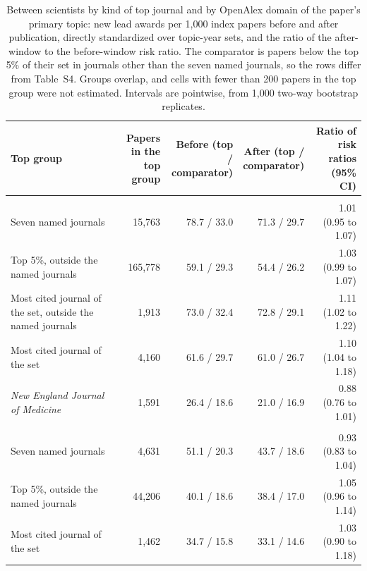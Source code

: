 \begin{table}[H]
\centering\small
\caption{Between scientists by kind of top journal and by OpenAlex domain of the paper's primary topic: new lead awards per 1,000 index papers before and after publication, directly standardized over topic-year sets, and the ratio of the after-window to the before-window risk ratio. The comparator is papers below the top 5\% of their set in journals other than the seven named journals, so the rows differ from Table~S4. Groups overlap, and cells with fewer than 200 papers in the top group were not estimated. Intervals are pointwise, from 1,000 two-way bootstrap replicates.}\label{tab:s_split}
\footnotesize
\begin{tabularx}{\linewidth}{>{\raggedright\arraybackslash}Xrrrr}
\toprule
Top group & \makecell[rb]{Papers in the\\top group} & \makecell[rb]{Before (top /\\comparator)} & \makecell[rb]{After (top /\\comparator)} & \makecell[rb]{Ratio of risk\\ratios (95\%\\CI)} \\
\midrule
\multicolumn{5}{>{\raggedright\arraybackslash}p{\dimexpr\textwidth-2\tabcolsep\relax}}{\textit{All domains}} \\
Seven named journals & 15,763 & 78.7 / 33.0 & 71.3 / 29.7 & 1.01 (0.95 to 1.07) \\
Top 5\%, outside the named journals & 165,778 & 59.1 / 29.3 & 54.4 / 26.2 & 1.03 (0.99 to 1.07) \\
Most cited journal of the set, outside the named journals & 1,913 & 73.0 / 32.4 & 72.8 / 29.1 & 1.11 (1.02 to 1.22) \\
Most cited journal of the set & 4,160 & 61.6 / 29.7 & 61.0 / 26.7 & 1.10 (1.04 to 1.18) \\
\textit{New England Journal of Medicine} & 1,591 & 26.4 / 18.6 & 21.0 / 16.9 & 0.88 (0.76 to 1.01) \\
\multicolumn{5}{>{\raggedright\arraybackslash}p{\dimexpr\textwidth-2\tabcolsep\relax}}{\textit{Health Sciences}} \\
Seven named journals & 4,631 & 51.1 / 20.3 & 43.7 / 18.6 & 0.93 (0.83 to 1.04) \\
Top 5\%, outside the named journals & 44,206 & 40.1 / 18.6 & 38.4 / 17.0 & 1.05 (0.96 to 1.14) \\
Most cited journal of the set & 1,462 & 34.7 / 15.8 & 33.1 / 14.6 & 1.03 (0.90 to 1.18) \\

\end{tabularx}
\end{table}
